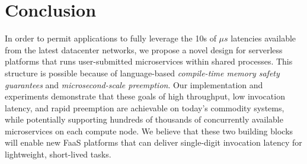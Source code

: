 \section{Conclusion}
\label{sec:concl}

In order to permit applications to fully leverage the 10s of $\mu{}s$
latencies available from the latest datacenter networks, we propose a novel design
for serverless platforms that runs user-submitted microservices within shared
processes.  This structure is possible because of language-based
\textit{compile-time memory safety guarantees} and \textit{microsecond-scale
preemption}.  Our implementation and experiments demonstrate that these goals of
high throughput, low invocation latency, and rapid preemption are achievable
on today's commodity systems, while potentially supporting hundreds of thousands of
concurrently available microservices on each compute node.  We believe that these
two building blocks will enable new FaaS platforms that can deliver single-digit
invocation latency for lightweight, short-lived tasks.

